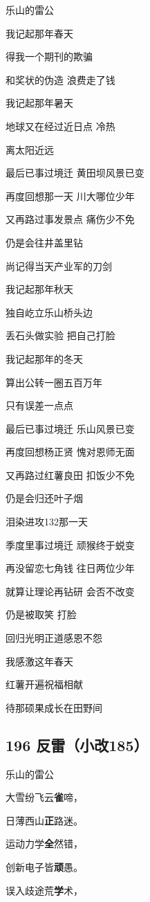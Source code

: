 {乐山的雷公}

我记起那年春天

得我一个期刊的欺骗

和奖状的伪造 浪费走了钱

我记起那年暑天

地球又在经过近日点 冷热

离太阳近远

最后已事过境迁 黄田坝风景已变

再度回想那一天 川大哪位少年

又再路过事发景点 痛伤少不免

仍是会往井盖里钻

尚记得当天产业军的刀剑

我记起那年秋天

独自屹立乐山桥头边

丢石头做实验 把自己打脸

我记起那年的冬天

算出公转一圈五百万年

只有误差一点点

最后已事过境迁 乐山风景已变

再度回想杨正贤 愧对恩师无面

又再路过红薯良田 扣饭少不免

仍是会归还叶子烟

泪染进攻132那一天

季度里事过境迁 顽猴终于蜕变

再没留恋七角钱 往日两位少年

就算让理论再钻研 会否不改变

仍是被取笑 打脸

回归光明正道感恩不怨

我感激这年春天

红薯开遍祝福相献

待那硕果成长在田野间

\hypertarget{ux53cdux96f7ux5c0fux6539185}{%
\subsection{196 反雷（小改185）}\label{ux53cdux96f7ux5c0fux6539185}}

乐山的雷公

大雪纷飞云\textbf{雀}啼，

日薄西山\textbf{正}路迷。

运动力学\textbf{全}然错，

创新电子皆\textbf{顽}愚。

误入歧途荒\textbf{学}术，

